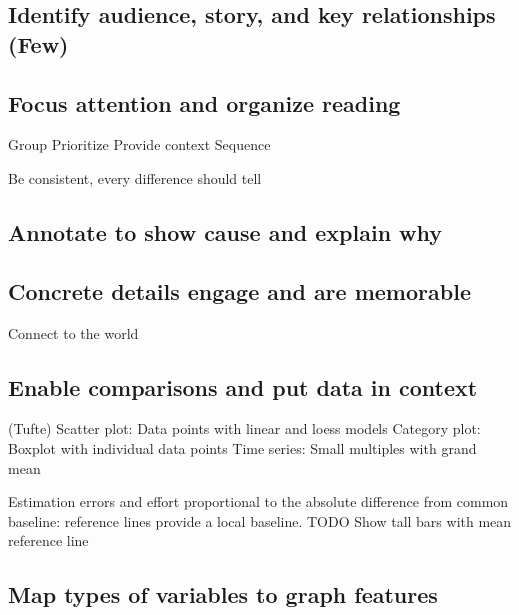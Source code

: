 \documentclass[]{krantz}
\begin{document}
\hypertarget{identify-audience-story-and-key-relationships-few}{%
\subsection{Identify audience, story, and key relationships (Few)}\label{identify-audience-story-and-key-relationships-few}}

\hypertarget{focus-attention-and-organize-reading}{%
\subsection{Focus attention and organize reading}\label{focus-attention-and-organize-reading}}

Group
Prioritize
Provide context
Sequence

Be consistent, every difference should tell

\hypertarget{annotate-to-show-cause-and-explain-why}{%
\subsection{Annotate to show cause and explain why}\label{annotate-to-show-cause-and-explain-why}}

\hypertarget{concrete-details-engage-and-are-memorable}{%
\subsection{Concrete details engage and are memorable}\label{concrete-details-engage-and-are-memorable}}

Connect to the world

\hypertarget{enable-comparisons-and-put-data-in-context}{%
\subsection{Enable comparisons and put data in context}\label{enable-comparisons-and-put-data-in-context}}

(Tufte)
Scatter plot: Data points with linear and loess models
Category plot: Boxplot with individual data points
Time series: Small multiples with grand mean

Estimation errors and effort proportional to the absolute difference from common baseline: reference lines provide a local baseline. TODO Show tall bars with mean reference line

\hypertarget{map-types-of-variables-to-graph-features}{%
\subsection{Map types of variables to graph features}\label{map-types-of-variables-to-graph-features}}
\end{document}
